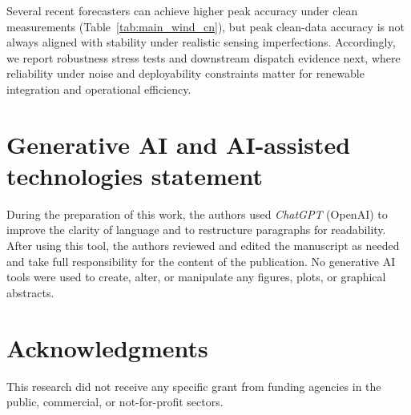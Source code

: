 \documentclass[review,3p,times]{elsarticle}
\begin{document}
Several recent forecasters can achieve higher peak accuracy under clean measurements (Table~\ref{tab:main_wind_cn}), but peak clean-data accuracy is not always aligned with stability under realistic sensing imperfections.
Accordingly, we report robustness stress tests and downstream dispatch evidence next, where reliability under noise and deployability constraints matter for renewable integration and operational efficiency.

\section*{Generative AI and AI-assisted technologies statement}
During the preparation of this work, the authors used \textit{ChatGPT} (OpenAI) to improve the clarity of language and to restructure paragraphs for readability. After using this tool, the authors reviewed and edited the manuscript as needed and take full responsibility for the content of the publication. No generative AI tools were used to create, alter, or manipulate any figures, plots, or graphical abstracts.

\section*{Acknowledgments}
This research did not receive any specific grant from funding agencies in the public, commercial, or not-for-profit sectors.


\end{document}
